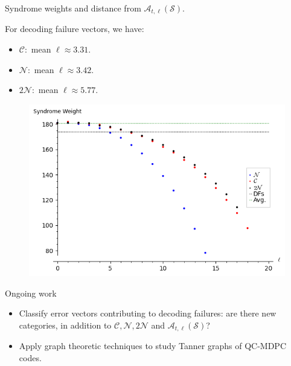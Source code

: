 \begin{frame}{Syndrome weights and distance from $\mathcal{A}_{t,\ell}(\mathcal{S})$.}

For decoding failure vectors, we have:

\begin{itemize}
    \item $\mathcal{C}:$ mean $\ell \approx 3.31$.
    \item $\mathcal{N}:$ mean $\ell \approx 3.42$.
    \item $2\mathcal{N}:$ mean $\ell \approx 5.77$.
\end{itemize}
    \begin{figure}
        \centering
        \includegraphics[scale=0.5]{Images/synweights_587.png}
    \end{figure}
\end{frame}

\begin{frame}{Ongoing work}
    \begin{itemize}
        \item Classify error vectors contributing to decoding failures: are there new categories, in addition to $\mathcal{C},\mathcal{N},2\mathcal{N}$ and $\mathcal{A}_{t,\ell}(\mathcal{S})$?
        \item Apply graph theoretic techniques to study Tanner graphs of QC-MDPC codes.
    \end{itemize}
\end{frame}